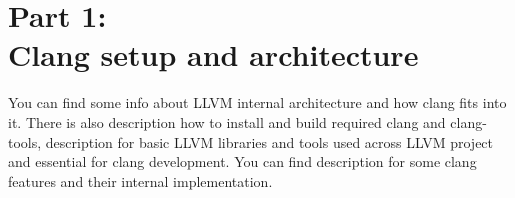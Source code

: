 \pagestyle{empty}
\pagecolor{Gray}
\color{black}

\chapter*{\textbf{Part 1:\\
    Clang setup and architecture}}

\begin{flushleft}

You can find some info about LLVM internal architecture and how clang fits into
it. There is also description how to install and build required clang and
clang-tools, description for basic LLVM libraries and tools used across LLVM
project and essential for clang development. You can find description for some
clang features and their internal implementation.

\end{flushleft}

\clearpage

\nopagecolor





\clearpage

